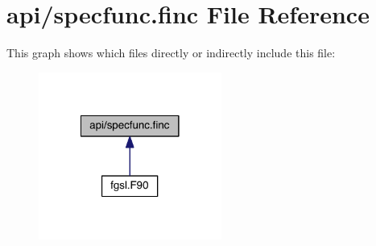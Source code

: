\hypertarget{specfunc_8finc}{\section{api/specfunc.finc File Reference}
\label{specfunc_8finc}
}
This graph shows which files directly or indirectly include this file\-:\nopagebreak
\begin{figure}[H]
\begin{center}
\leavevmode
\includegraphics[width=170pt]{specfunc_8finc__dep__incl}
\end{center}
\end{figure}

